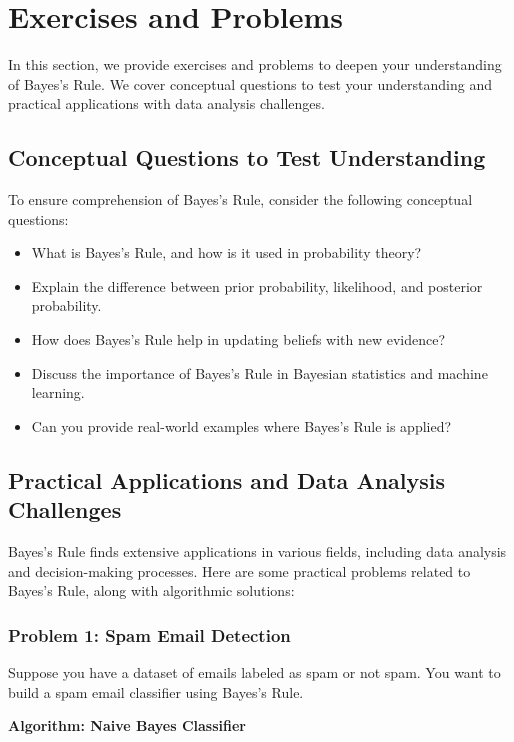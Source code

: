 \documentclass[12pt]{book} %
\begin{document}
\section{Exercises and Problems}
In this section, we provide exercises and problems to deepen your understanding of Bayes's Rule. We cover conceptual questions to test your understanding and practical applications with data analysis challenges.

\subsection{Conceptual Questions to Test Understanding}
To ensure comprehension of Bayes's Rule, consider the following conceptual questions:

\begin{itemize}
    \item What is Bayes's Rule, and how is it used in probability theory?
    \item Explain the difference between prior probability, likelihood, and posterior probability.
    \item How does Bayes's Rule help in updating beliefs with new evidence?
    \item Discuss the importance of Bayes's Rule in Bayesian statistics and machine learning.
    \item Can you provide real-world examples where Bayes's Rule is applied?
\end{itemize}

\subsection{Practical Applications and Data Analysis Challenges}
Bayes's Rule finds extensive applications in various fields, including data analysis and decision-making processes. Here are some practical problems related to Bayes's Rule, along with algorithmic solutions:

\subsubsection{Problem 1: Spam Email Detection}
Suppose you have a dataset of emails labeled as spam or not spam. You want to build a spam email classifier using Bayes's Rule.

\textbf{Algorithm: Naive Bayes Classifier}
\end{document}
